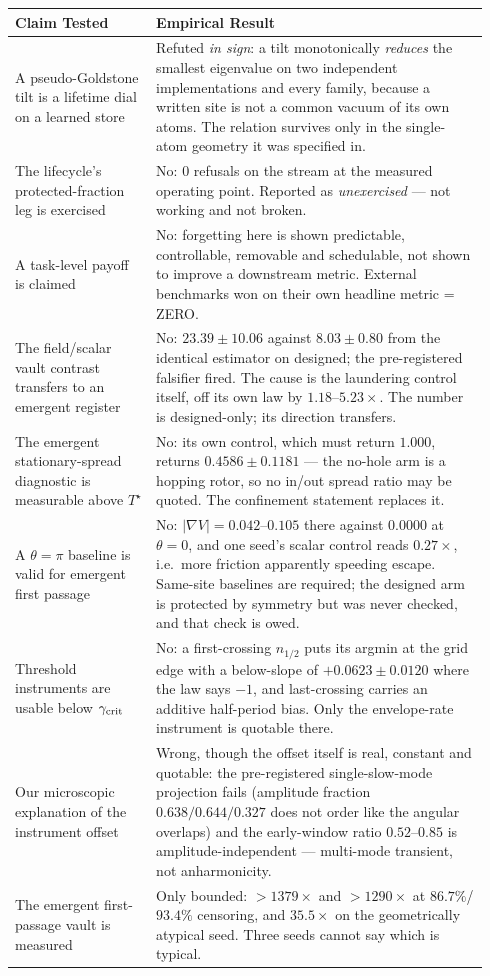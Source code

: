 \documentclass{article}
\begin{document}
\begin{center}
\begin{tabular}{p{0.28\linewidth}p{0.66\linewidth}}
\toprule
Claim Tested & Empirical Result\\
\midrule
A pseudo-Goldstone tilt is a lifetime dial on a learned store & Refuted \emph{in sign}: a tilt monotonically \emph{reduces} the smallest eigenvalue on two independent implementations and every family, because a written site is not a common vacuum of its own atoms. The relation survives only in the single-atom geometry it was specified in.\\
The lifecycle's protected-fraction leg is exercised & No: 0 refusals on the stream at the measured operating point. Reported as \emph{unexercised} --- not working and not broken.\\
A task-level payoff is claimed & No: forgetting here is shown predictable, controllable, removable and schedulable, not shown to improve a downstream metric. External benchmarks won on their own headline metric = ZERO.\\
The field/scalar vault contrast transfers to an emergent register & No: $23.39\pm10.06$ against $8.03\pm0.80$ from the identical estimator on designed; the pre-registered falsifier fired. The cause is the laundering control itself, off its own law by $1.18$--$5.23\times$. The number is designed-only; its direction transfers.\\
The emergent stationary-spread diagnostic is measurable above $T^\star$ & No: its own control, which must return $1.000$, returns $0.4586\pm0.1181$ --- the no-hole arm is a hopping rotor, so no in/out spread ratio may be quoted. The confinement statement replaces it.\\
A $\theta=\pi$ baseline is valid for emergent first passage & No: $|\nabla V|=0.042$--$0.105$ there against $0.0000$ at $\theta=0$, and one seed's scalar control reads $0.27\times$, i.e.\ more friction apparently speeding escape. Same-site baselines are required; the designed arm is protected by symmetry but was never checked, and that check is owed.\\
Threshold instruments are usable below $\gamma_{\rm crit}$ & No: a first-crossing $n_{1/2}$ puts its argmin at the grid edge with a below-slope of $+0.0623\pm0.0120$ where the law says $-1$, and last-crossing carries an additive half-period bias. Only the envelope-rate instrument is quotable there.\\
Our microscopic explanation of the instrument offset & Wrong, though the offset itself is real, constant and quotable: the pre-registered single-slow-mode projection fails (amplitude fraction $0.638/0.644/0.327$ does not order like the angular overlaps) and the early-window ratio $0.52$--$0.85$ is amplitude-independent --- multi-mode transient, not anharmonicity.\\
The emergent first-passage vault is measured & Only bounded: $>1379\times$ and $>1290\times$ at $86.7\%$/$93.4\%$ censoring, and $35.5\times$ on the geometrically atypical seed. Three seeds cannot say which is typical.\\
\bottomrule
\end{tabular}
\end{center}
\end{document}
